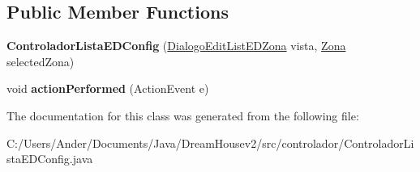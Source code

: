 \subsection*{Public Member Functions}
\begin{DoxyCompactItemize}
\item 
\mbox{\label{classcontrolador_1_1_controlador_lista_e_d_config_a041bd885847cb277021a95a25a08bc11}} 
{\bfseries Controlador\+Lista\+E\+D\+Config} (\mbox{\hyperlink{classvista_1_1_dialogo_edit_list_e_d_zona}{Dialogo\+Edit\+List\+E\+D\+Zona}} vista, \mbox{\hyperlink{classmodelo_1_1_zona}{Zona}} selected\+Zona)
\item 
\mbox{\label{classcontrolador_1_1_controlador_lista_e_d_config_aa409cf951eee8e6ffee0b092c2164684}} 
void {\bfseries action\+Performed} (Action\+Event e)
\end{DoxyCompactItemize}


The documentation for this class was generated from the following file\+:\begin{DoxyCompactItemize}
\item 
C\+:/\+Users/\+Ander/\+Documents/\+Java/\+Dream\+Housev2/src/controlador/Controlador\+Lista\+E\+D\+Config.\+java\end{DoxyCompactItemize}

